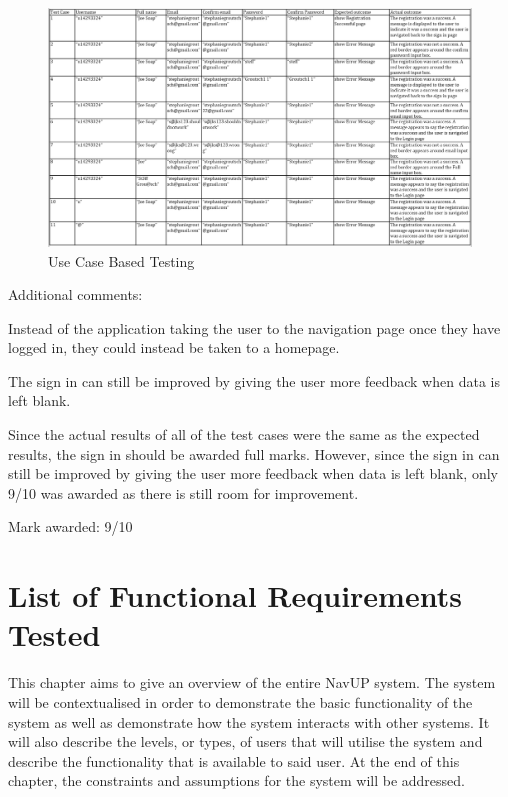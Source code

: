 \documentclass[english]{article}
\begin{document}
\begin{figure}[H]
\centering
\includegraphics[width=1.0\textwidth]{login_use_case_based_testing}
\caption{Use Case Based Testing}
\end{figure}

Additional comments:

Instead of the application taking the user to the navigation page once they have logged in, they could instead be taken to a homepage. 

The sign in can still be improved by giving the user more feedback when data is left blank.

Since the actual results of all of the test cases were the same as the expected results, the sign in should be awarded full marks. However, since the sign in can still be improved by giving the user more feedback when data is left blank, only 9/10 was awarded as there is still room for improvement.

Mark awarded: 9/10

	\section{List of Functional Requirements Tested}
	This chapter aims to give an overview of the entire NavUP system. The system will be contextualised in order to demonstrate the basic functionality of the system as well as demonstrate how the system interacts with other systems. It will also describe the levels, or types, of users that will utilise the system and describe the functionality that is available to said user. At the end of this chapter, the constraints and assumptions for the system will be addressed.
	
\end{document}

